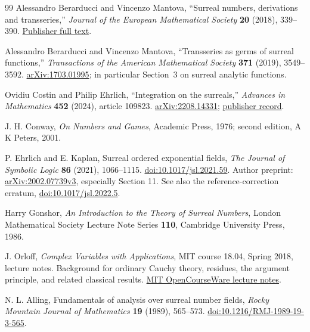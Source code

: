 \documentclass[11pt,a4paper]{article}
\numberwithin{equation}{section}
\theoremstyle{definition}
\theoremstyle{remark}
\theoremstyle{plain}
\begin{document}
\begin{thebibliography}{99}
Alessandro Berarducci and Vincenzo Mantova, ``Surreal numbers, derivations and transseries,'' \emph{Journal of the European Mathematical Society} \textbf{20} (2018), 339--390. \href{https://ems.press/content/serial-article-files/32275}{Publisher full text}.

Alessandro Berarducci and Vincenzo Mantova, ``Transseries as germs of surreal functions,'' \emph{Transactions of the American Mathematical Society} \textbf{371} (2019), 3549--3592. \href{https://arxiv.org/abs/1703.01995}{arXiv:1703.01995}; in particular Section~3 on surreal analytic functions.

Ovidiu Costin and Philip Ehrlich, ``Integration on the surreals,'' \emph{Advances in Mathematics} \textbf{452} (2024), article 109823. \href{https://arxiv.org/abs/2208.14331}{arXiv:2208.14331}; \href{https://www.sciencedirect.com/science/article/pii/S0001870824003384}{publisher record}.

J. H. Conway, \emph{On Numbers and Games}, Academic Press, 1976; second edition, A K Peters, 2001.

P. Ehrlich and E. Kaplan, Surreal ordered exponential fields, \emph{The Journal of Symbolic Logic} \textbf{86} (2021), 1066--1115. \href{https://doi.org/10.1017/jsl.2021.59}{doi:10.1017/jsl.2021.59}. Author preprint: \href{https://arxiv.org/abs/2002.07739}{arXiv:2002.07739v3}, especially Section 11. See also the reference-correction erratum, \href{https://doi.org/10.1017/jsl.2022.5}{doi:10.1017/jsl.2022.5}.

Harry Gonshor, \emph{An Introduction to the Theory of Surreal Numbers}, London Mathematical Society Lecture Note Series \textbf{110}, Cambridge University Press, 1986.

J. Orloff, \emph{Complex Variables with Applications}, MIT course 18.04, Spring 2018, lecture notes. Background for ordinary Cauchy theory, residues, the argument principle, and related classical results. \href{https://ocw.mit.edu/courses/18-04-complex-variables-with-applications-spring-2018/pages/lecture-notes/}{MIT OpenCourseWare lecture notes}.

N. L. Alling, Fundamentals of analysis over surreal number fields, \emph{Rocky Mountain Journal of Mathematics} \textbf{19} (1989), 565--573. \href{https://doi.org/10.1216/RMJ-1989-19-3-565}{doi:10.1216/RMJ-1989-19-3-565}.


\end{thebibliography}
\end{document}
